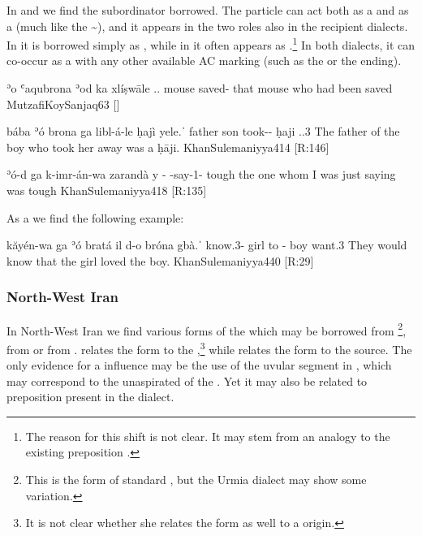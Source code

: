 In \JSul and \Koy we find the \Sor subordinator  borrowed. The \Sor particle can act both as a \rel* and as a \comp* (much like the  \lnk* {}\~), and it appears in the two roles also in the recipient  dialects. In \Koy it is borrowed simply as , while in \JSul it often appears as .\footnote{The reason for this shift is not clear. It may stem from an analogy to the existing preposition .}  In both dialects,  it can co-occur as a  with any other available AC marking  (such as the \Koy \lnk* {} or the \JSul \cst* ending).

{ʾo ʿaqubrona ʾod ka xlíṣwāle}
{\dem.\far.\sg{} mouse \lnk{} \rel{} saved-\masc}
{that mouse who had been saved}
{MutzafiKoySanjaq}{63 {[]}}

{bába ʾó\cb{} brona ga\cb{} libl-á-le ḥajì \cb{}yele.ˈ}
{father \dem\cb{} son \rel\cb{} took-\fem-\masc{} ḥaji \cb{}\cop.\pst.3\masc}
{The father of the boy who took her away was a ḥāji.}
{KhanSulemaniyya}{414 {[R:146]}}

{ʾó-d ga\cb{} k-imr-án-wa zarandà \cb{}y}
{\dem-\cst{} \rel\cb{} \ind-say-1\sg-\pst{} tough \cb{}\cop}
{the one whom I was just saying was tough}
{KhanSulemaniyya}{418 {[R:135]}}

As a \comp* we find the following example:

{kăyén-wa ga\cb{} ʾó bratá il\cb{} d-o\cb{} bróna gbà.ˈ}
{know.3\pl-\pst{} \comp\cb{} \dem{} girl to\cb{} \gen-\dem\cb{} boy want.3\fem}
{They would know that the girl loved the boy.}
{KhanSulemaniyya}{440 {[R:29]}}

\subsubsection{North-West Iran}

In North-West Iran we find various forms of the \rel* which may be borrowed from \Kur {}\footnote{This is the form of standard \Kur, but the Urmia dialect may show some variation.}, from \Per {} or from \Azr {}. \citet[180]{YounansardaroudSardarid} relates the \Sar form  to the  \rel* {},\footnote{It is not clear  whether she relates the form  as well to a  origin.} while \citet[172, \S 2.32.1.(5)]{Garbell1965impact} relates the \JUrm form  to the \Azr source. The only evidence for a \Kur influence may be the use of the uvular  segment in \Sar {}, which may correspond to the unaspirated  of the \Kur \rel*. Yet  it may also be related to preposition  present in the dialect.

